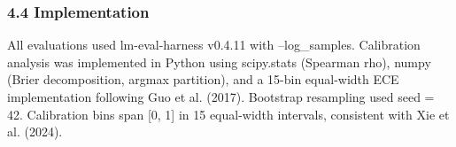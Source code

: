 \subsubsection{4.4 Implementation}

All evaluations used lm-eval-harness v0.4.11 with --log\_samples. Calibration analysis was implemented in Python using scipy.stats (Spearman rho), numpy (Brier decomposition, argmax partition), and a 15-bin equal-width ECE implementation following Guo et al. (2017). Bootstrap resampling used seed = 42. Calibration bins span [0, 1] in 15 equal-width intervals, consistent with Xie et al. (2024).
